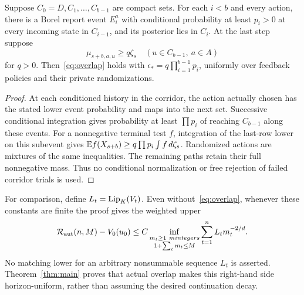 \begin{proposition}\label{prop:corridor}
Suppose $C_0=D,C_1,\ldots,C_{b-1}$ are compact sets. For each $i<b$ and every action, there is a Borel report event $E_i^a$ with conditional probability at least $p_i>0$ at every incoming state in $C_{i-1}$, and its posterior lies in $C_i$. At the last step suppose
\[
 \mu_{s+b,a,u}\ge q\zeta_s
 \quad (u\in C_{b-1},\ a\in A)
\]
for $q>0$. Then~\eqref{eq:overlap} holds with
$\epsilon_*=q\prod_{i=1}^{b-1}p_i$, uniformly over feedback policies and their private randomizations.
\end{proposition}
\begin{proof}
At each conditioned history in the corridor, the action actually chosen has the stated lower event probability and maps into the next set. Successive conditional integration gives probability at least $\prod p_i$ of reaching $C_{b-1}$ along these events. For a nonnegative terminal test $f$, integration of the last-row lower on this subevent gives $\mathbb E f(X_{s+b})\ge q\prod p_i\int f\,d\zeta_s$. Randomized actions are mixtures of the same inequalities. The remaining paths retain their full nonnegative mass. Thus no conditional normalization or free rejection of failed corridor trials is used.
\end{proof}

For comparison, define $L_t=\operatorname{Lip}_K(V_t)$. Even without~\eqref{eq:overlap}, whenever these constants are finite the proof gives the weighted upper
\begin{equation}\label{eq:weighted}
 \mathcal R_{\rm aut}(n,M)-V_0(u_0)
 \le C\inf_{\substack{m_t\ge1\ {
m integers}\\1+\sum_tm_t\le M}}
                 \sum_{t=1}^n L_t m_t^{-2/d}.
\end{equation}
No matching lower for an arbitrary nonsummable sequence $L_t$ is asserted. Theorem~\ref{thm:main} proves that actual overlap makes this right-hand side horizon-uniform, rather than assuming the desired continuation decay.
